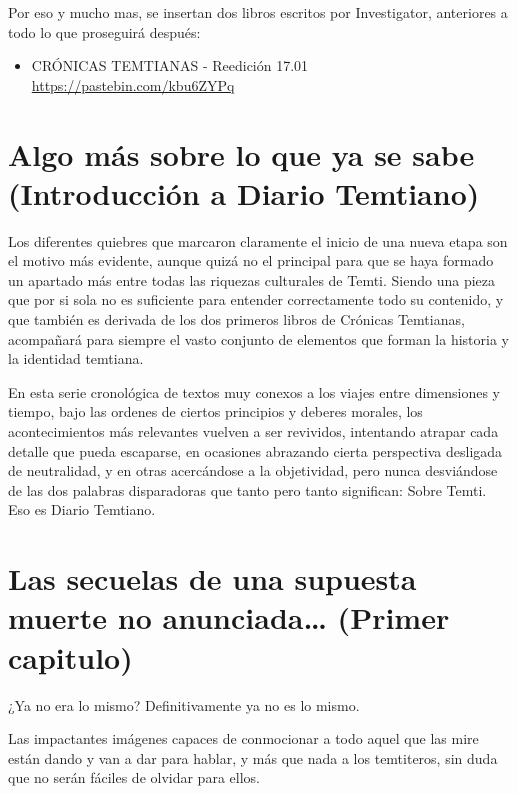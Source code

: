 \documentclass[
  spanish,
]{book}
\providecommand{\tightlist}{%
  \setlength{\itemsep}{0pt}\setlength{\parskip}{0pt}}
\begin{document}
Por eso y mucho mas, se insertan dos libros escritos por Investigator, anteriores a todo lo que proseguirá después:

\begin{itemize}
\tightlist
\item
  CRÓNICAS TEMTIANAS - Reedición 17.01
  \url{https://pastebin.com/kbu6ZYPq}
\end{itemize}

\hypertarget{algo-muxe1s-sobre-lo-que-ya-se-sabe-introducciuxf3n-a-diario-temtiano}{%
\chapter{Algo más sobre lo que ya se sabe (Introducción a Diario Temtiano)}\label{algo-muxe1s-sobre-lo-que-ya-se-sabe-introducciuxf3n-a-diario-temtiano}}

Los diferentes quiebres que marcaron claramente el inicio de una nueva etapa son el motivo más evidente, aunque quizá no el principal para que se haya formado un apartado más entre todas las riquezas culturales de Temti. Siendo una pieza que por si sola no es suficiente para entender correctamente todo su contenido, y que también es derivada de los dos primeros libros de Crónicas Temtianas, acompañará para siempre el vasto conjunto de elementos que forman la historia y la identidad temtiana.

En esta serie cronológica de textos muy conexos a los viajes entre dimensiones y tiempo, bajo las ordenes de ciertos principios y deberes morales, los acontecimientos más relevantes vuelven a ser revividos, intentando atrapar cada detalle que pueda escaparse, en ocasiones abrazando cierta perspectiva desligada de neutralidad, y en otras acercándose a la objetividad, pero nunca desviándose de las dos palabras disparadoras que tanto pero tanto significan: Sobre Temti. Eso es Diario Temtiano.

\hypertarget{las-secuelas-de-una-supuesta-muerte-no-anunciada-primer-capitulo}{%
\chapter{Las secuelas de una supuesta muerte no anunciada\ldots{} (Primer capitulo)}\label{las-secuelas-de-una-supuesta-muerte-no-anunciada-primer-capitulo}}

¿Ya no era lo mismo? Definitivamente ya no es lo mismo.

Las impactantes imágenes capaces de conmocionar a todo aquel que las mire están dando y van a dar para hablar, y más que nada a los temtiteros, sin duda que no serán fáciles de olvidar para ellos.
\end{document}
